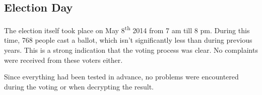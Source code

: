 \subsection{Election Day}

The election itself took place on May 8\textsuperscript{th} 2014 from 7 am till 8 pm. During this time, 768 people cast a ballot, which isn't significantly less than during previous years. This is a strong indication that the voting process was clear. No complaints were received from these voters either.

\par Since everything had been tested in advance, no problems were encountered during the voting or when decrypting the result.
